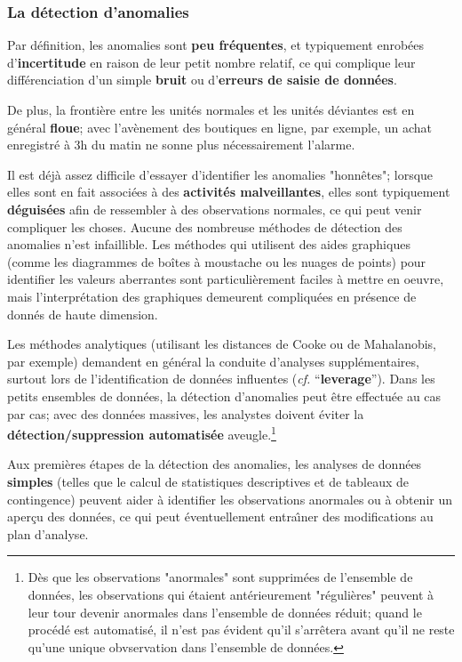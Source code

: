 \subsubsection*{La d\'etection d'anomalies}  Par d\'efinition, les anomalies sont \textbf{peu fréquentes}, et typiquement enrob\'ees d'\textbf{incertitude} en raison de leur petit nombre relatif, ce qui complique leur  différenciation d'un simple \textbf{bruit} ou d'\textbf{erreurs de saisie de donn\'ees}. \par De plus, la fronti\`ere entre les unités normales et les unités déviantes est en g\'en\'eral \textbf{floue}; avec l'avènement des boutiques en ligne, par exemple, un achat enregistr\'e à 3h du matin ne sonne plus nécessairement l'alarme. \par Il est déjà assez difficile d'essayer d'identifier les anomalies "honnêtes"; lorsque elles sont en fait associées à des \textbf{activités malveillantes}, elles sont typiquement \textbf{déguisées} afin de ressembler à des ob\-ser\-va\-tions normales, ce qui peut venir compliquer les choses.  
\newl
Aucune des nombreuse m\'ethodes de d\'etection des ano\-malies n'est infaillible. Les méthodes qui utilisent des aides graphiques (comme les diagrammes de boîtes \`a moustache ou les nuages de points) pour identifier les valeurs aberrantes sont particulièrement faciles à mettre en oeuvre, mais l'interpr\'etation des graphiques demeurent compliqu\'ees en pr\'esence de donn\'es de haute dimension. \par Les méthodes analytiques (utilisant les distances de Cooke ou de Mahalanobis, par exemple) demandent en g\'en\'eral la conduite d'analyses supplémentaires, surtout lors de l'identification de donn\'ees influentes (\textit{cf.} ``\textbf{leverage}''). 
\newl Dans les petits ensembles de données, la détection d'ano\-ma\-lies peut être effectuée au cas par cas; avec des donn\'ees massives, les analystes doivent \'eviter la \textbf{détection/suppression automatisée} aveugle.\footnote{D\`es que les ob\-ser\-va\-tions "anormales" sont supprim\'ees de l'ensemble de données, les ob\-ser\-va\-tions qui \'etaient ant\'erieurement "régulières" peuvent à leur tour devenir anormales dans l'ensemble de données r\'eduit; quand le proc\'ed\'e est automatis\'e, il n'est pas \'evident qu'il s'arr\^etera avant qu'il ne reste  qu'une unique obvservation dans l'ensemble de donn\'ees.}\par
Aux premières \'etapes de la détection des anomalies, les analyses de donn\'ees \textbf{simples} (telles que le calcul de statistiques descriptives et de tableaux de contingence) peuvent aider  à identifier les ob\-ser\-va\-tions anormales ou \`a  obtenir un aperçu des données, ce qui peut éventuellement entra\^{\i}ner des modifications au plan d'analyse.
